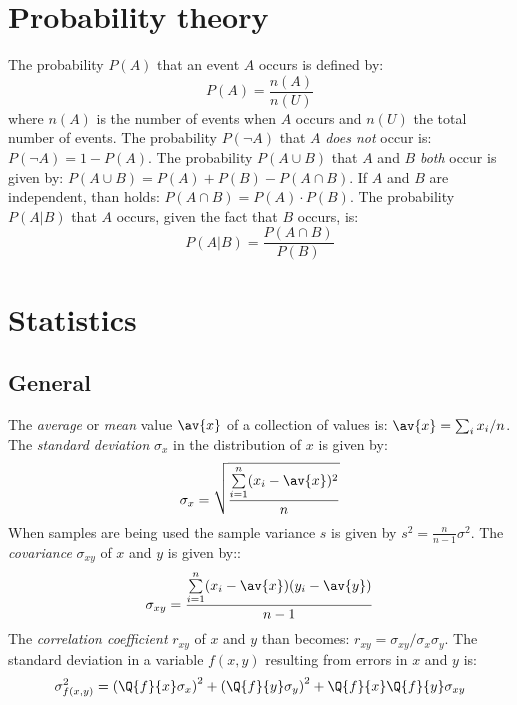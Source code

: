 \section{Probability theory}
The probability $P(A)$ that an event $A$ occurs is defined by:
\[
P(A)=\frac{n(A)}{n(U)}
\]
where $n(A)$ is the number of events when $A$ occurs and $n(U)$ the total
number of events.
\npar
The probability $P(\neg A)$ that $A$ {\it does not} occur is: $P(\neg A)=1-P(A)$.
The probability $P(A\cup B)$ that $A$ and $B$ {\it both} occur is given by:
$P(A\cup B)=P(A)+P(B)-P(A\cap B)$. If $A$ and $B$ are independent, than holds:
$P(A\cap B)=P(A)\cdot P(B)$.
\npar
The probability $P(A|B)$ that $A$ occurs, given the fact that $B$ occurs, is:
\[
P(A|B)=\frac{P(A\cap B)}{P(B)}
\]

\section{Statistics}
\subsection{General}
The {\it average} or {\it mean} value $\av{x}$ of a collection of values is:
$\av{x}=\sum_i x_i/n$. The {\it standard deviation} $\sigma_x$ in the
distribution of $x$ is given by:
\[
\sigma_x=\sqrt{\frac{\sum\limits_{i=1}^n(x_i-\av{x})^2}{n}}
\]
When samples are being used the sample variance $s$ is given by
$\displaystyle s^2=\frac{n}{n-1}\sigma^2$.
\npar
The {\it covariance} $\sigma_{xy}$ of $x$ and $y$ is given by::
\[
\sigma_{xy}=\frac{\sum\limits_{i=1}^n(x_i-\av{x})(y_i-\av{y})}{n-1}
\]
The {\it correlation coefficient} $r_{xy}$ of $x$ and $y$ than becomes:
$r_{xy}=\sigma_{xy}/\sigma_x\sigma_y$.
\npar
The standard deviation in a variable $f(x,y)$ resulting from errors in
$x$ and $y$ is:
\[
\sigma^2_{f(x,y)}=\left(\Q{f}{x}\sigma_x\right)^2+\left(\Q{f}{y}\sigma_y\right)^2+
\Q{f}{x}\Q{f}{y}\sigma_{xy}
\]

